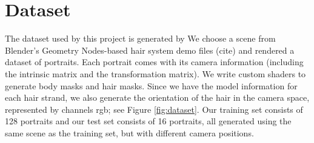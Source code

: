 \documentclass[12pt]{article}
\begin{document}
\section{Dataset}


The dataset used by this project is generated by We choose a scene from Blender's Geometry Nodes-based hair system demo files (cite) and rendered a dataset of portraits. Each portrait comes with its camera information (including the intrinsic matrix and the transformation matrix). We write custom shaders to generate body masks and hair masks. Since we have the model information for each hair strand, we also generate the orientation of the hair in the camera space, represented by channels rgb; see Figure \ref{fig:dataset}. Our training set consists of 128 portraits and our test set consists of 16 portraits, all generated using the same scene as the training set, but with different camera positions.
\end{document}
